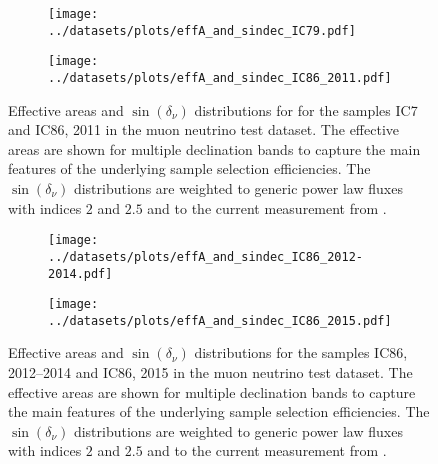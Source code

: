 \begin{figure}[htbp]
  \centering
  \begin{subfigure}[t]{\textwidth}
    \centering
    \texttt{[image: ../datasets/plots/effA\_and\_sindec\_IC79.pdf]}
  \end{subfigure}
  \hfill
  \begin{subfigure}[t]{\textwidth}
    \centering
    \texttt{[image: ../datasets/plots/effA\_and\_sindec\_IC86\_2011.pdf]}
  \end{subfigure}
  \caption[Effective areas and $\sin(\delta_\nu)$ distributions for IC79, IC86'12]{
    Effective areas and $\sin(\delta_\nu)$ distributions for for the samples IC7 and IC86, 2011 in the muon neutrino test dataset.
    The effective areas are shown for multiple declination bands to capture the main features of the underlying sample selection efficiencies.
    The $\sin(\delta_\nu)$ distributions are weighted to generic power law fluxes with indices $2$ and $2.5$ and to the current measurement from \cite{Haack:2017dxi}.
    }
  \label{fig:effA_and_sindec_79_86I}
\end{figure}

\begin{figure}[htbp]
  \centering
  \begin{subfigure}[t]{\textwidth}
    \centering
    \texttt{[image: ../datasets/plots/effA\_and\_sindec\_IC86\_2012-2014.pdf]}
  \end{subfigure}
  \hfill
  \begin{subfigure}[t]{\textwidth}
    \centering
    \texttt{[image: ../datasets/plots/effA\_and\_sindec\_IC86\_2015.pdf]}
  \end{subfigure}
  \caption[Effective areas and $\sin(\delta_\nu)$ distributions for IC86'12--'14, IC86'15]{
    Effective areas and $\sin(\delta_\nu)$ distributions for the samples IC86, 2012--2014 and IC86, 2015 in the muon neutrino test dataset.
    The effective areas are shown for multiple declination bands to capture the main features of the underlying sample selection efficiencies.
    The $\sin(\delta_\nu)$ distributions are weighted to generic power law fluxes with indices $2$ and $2.5$ and to the current measurement from \cite{Haack:2017dxi}.
  }
  \label{fig:effA_and_sindec_86II_86V}
\end{figure}

